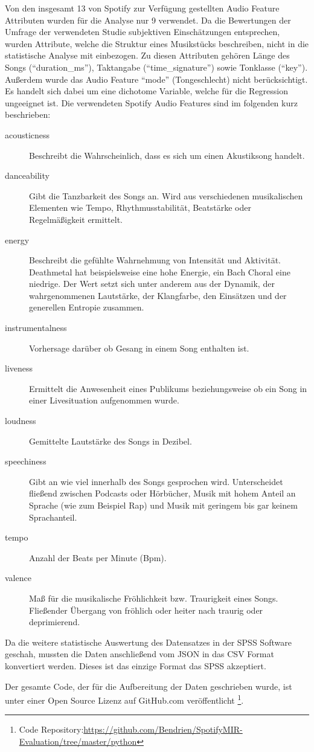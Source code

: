 Von den insgesamt 13 von Spotify zur Verfügung gestellten Audio Feature Attributen wurden für die Analyse nur 9 verwendet.
Da die Bewertungen der Umfrage der verwendeten Studie subjektiven Einschätzungen entsprechen, wurden Attribute, welche die Struktur eines Musikstücks beschreiben, nicht in die statistische Analyse mit einbezogen.
Zu diesen Attributen gehören Länge des Songs ("`duration\_ms"'), Taktangabe ("`time\_signature"') sowie  Tonklasse ("`key"').
Außerdem wurde das Audio Feature "`mode"' (Tongeschlecht) nicht berücksichtigt. Es handelt sich dabei um eine dichotome Variable, welche für die Regression ungeeignet ist.
Die verwendeten Spotify Audio Features sind im folgenden kurz beschrieben:

\begin{description}
    \item[acousticness]
        Beschreibt die Wahrscheinlich, dass  es sich um einen Akustiksong handelt.
    \item[danceability]
        Gibt die Tanzbarkeit des Songs an.
        Wird aus verschiedenen musikalischen Elementen wie Tempo, Rhythmusstabilität, Beatstärke oder Regelmäßigkeit ermittelt.
    \item[energy]
        Beschreibt die gefühlte Wahrnehmung von Intensität und Aktivität.
        Deathmetal hat beispielsweise eine hohe Energie, ein Bach Choral eine niedrige. Der Wert setzt sich unter anderem aus der Dynamik, der wahrgenommenen Lautstärke, der Klangfarbe, den Einsätzen und der generellen Entropie zusammen.
    \item[instrumentalness]
        Vorhersage darüber ob Gesang in einem Song enthalten ist.
    \item[liveness]
        Ermittelt die Anwesenheit eines Publikums beziehungsweise ob ein Song in einer Livesituation aufgenommen wurde.
    \item[loudness]
        Gemittelte Lautstärke des Songs in Dezibel.
    \item[speechiness]
        Gibt an wie viel innerhalb des Songs gesprochen wird.
        Unterscheidet fließend zwischen Podcasts oder Hörbücher, Musik mit hohem Anteil an Sprache (wie zum Beispiel Rap) und Musik mit geringem bis gar keinem Sprachanteil.
    \item[tempo]
        Anzahl der Beats per Minute (Bpm).
    \item[valence]
        Maß für die musikalische Fröhlichkeit bzw. Traurigkeit eines Songs.
        Fließender Übergang von fröhlich oder heiter nach traurig oder deprimierend.
\end{description}

Da die weitere statistische Auswertung des Datensatzes in der SPSS Software geschah, mussten die Daten anschließend vom JSON in das CSV Format konvertiert werden. Dieses ist das einzige Format das SPSS akzeptiert.

Der gesamte Code, der für die Aufbereitung der Daten geschrieben wurde, ist unter einer Open Source Lizenz auf GitHub.com veröffentlicht \footnote{Code Repository:\hfill \url{https://github.com/Bendrien/SpotifyMIR-Evaluation/tree/master/python}}.

